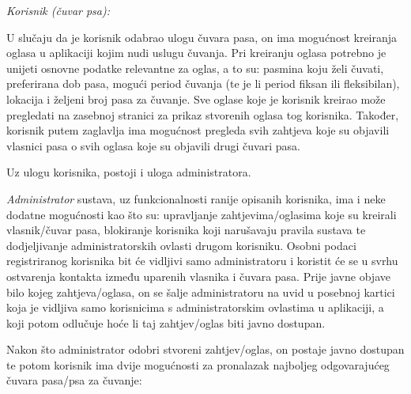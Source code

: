 		\textit{Korisnik (čuvar psa):}
		
		U slučaju da je korisnik odabrao ulogu čuvara pasa, on ima mogućnost kreiranja oglasa u aplikaciji kojim nudi uslugu čuvanja. Pri kreiranju oglasa potrebno je unijeti osnovne podatke relevantne za oglas, a to su: pasmina koju želi čuvati, preferirana dob pasa, mogući period čuvanja (te je li period fiksan ili fleksibilan), lokacija i željeni broj pasa za čuvanje. Sve oglase koje je korisnik kreirao može pregledati na zasebnoj stranici za prikaz stvorenih oglasa tog korisnika. Također, korisnik putem zaglavlja ima mogućnost pregleda svih zahtjeva koje su objavili vlasnici pasa o svih oglasa koje su objavili drugi čuvari pasa.
		
		Uz ulogu korisnika, postoji i uloga administratora.
		
		\textit{Administrator} sustava, uz funkcionalnosti ranije opisanih korisnika, ima i neke dodatne mogućnosti kao što su: upravljanje zahtjevima/oglasima koje su kreirali vlasnik/čuvar pasa, blokiranje korisnika koji narušavaju pravila sustava te dodjeljivanje administratorskih ovlasti drugom korisniku. Osobni podaci registriranog korisnika bit će vidljivi samo administratoru i koristit će se u svrhu ostvarenja kontakta između uparenih vlasnika i čuvara pasa. Prije javne objave bilo kojeg zahtjeva/oglasa, on se šalje administratoru na uvid u posebnoj kartici koja je vidljiva samo korisnicima s administratorskim ovlastima u aplikaciji, a koji potom odlučuje hoće li taj zahtjev/oglas biti javno dostupan.
		
		Nakon što administrator odobri stvoreni zahtjev/oglas, on postaje javno dostupan te potom korisnik ima dvije mogućnosti za pronalazak najboljeg odgovarajućeg čuvara pasa/psa za čuvanje:
		
